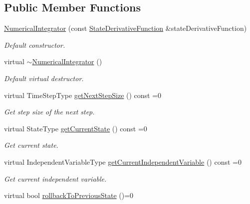 \subsection*{Public Member Functions}
\begin{DoxyCompactItemize}
\item 
\hyperlink{classtudat_1_1numerical__integrators_1_1NumericalIntegrator_abc2bd9d5804101036116510ce87be2db}{Numerical\+Integrator} (const \hyperlink{classtudat_1_1numerical__integrators_1_1NumericalIntegrator_a0d0a5d48ebaf1f5ad9cd7a73b44be0fc}{State\+Derivative\+Function} \&state\+Derivative\+Function)
\begin{DoxyCompactList}\small\item\em Default constructor. \end{DoxyCompactList}\item 
virtual \hyperlink{classtudat_1_1numerical__integrators_1_1NumericalIntegrator_abaa3ce86883c7bc620b6473500557ccb}{$\sim$\+Numerical\+Integrator} ()
\begin{DoxyCompactList}\small\item\em Default virtual destructor. \end{DoxyCompactList}\item 
virtual Time\+Step\+Type \hyperlink{classtudat_1_1numerical__integrators_1_1NumericalIntegrator_ab8b38ad002b10d53adf7b2c2282a86cc}{get\+Next\+Step\+Size} () const =0
\begin{DoxyCompactList}\small\item\em Get step size of the next step. \end{DoxyCompactList}\item 
virtual State\+Type \hyperlink{classtudat_1_1numerical__integrators_1_1NumericalIntegrator_a90b09d8d6a9b07d495bfabe9122748a1}{get\+Current\+State} () const =0
\begin{DoxyCompactList}\small\item\em Get current state. \end{DoxyCompactList}\item 
virtual Independent\+Variable\+Type \hyperlink{classtudat_1_1numerical__integrators_1_1NumericalIntegrator_a8ca318a39081842472ccd1a165ec06a4}{get\+Current\+Independent\+Variable} () const =0
\begin{DoxyCompactList}\small\item\em Get current independent variable. \end{DoxyCompactList}\item 
virtual bool \hyperlink{classtudat_1_1numerical__integrators_1_1NumericalIntegrator_a87d34e8535b55d430a511fb7e345dc2b}{rollback\+To\+Previous\+State} ()=0

\end{DoxyCompactItemize}
